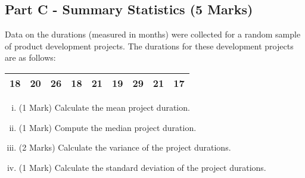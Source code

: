 \documentclass[a4paper,12pt]{article}
\begin{document}
\vspace{0.25cm}
\subsection*{Part C - Summary Statistics (5 Marks)} %
Data on the durations (measured in months) were collected for a random sample of product development projects. The durations for these development projects are as follows:

\begin{table}[ht]
	\centering
	\begin{tabular}{|rrrrrrrrr|}
		\hline
		
		18& 20& 26& 18& 21& 19& 29& 21& 17\\ 
		\hline
	\end{tabular}
\end{table}
\vspace{-0.5cm}


\begin{enumerate}[(i)]
	\item (1 Mark) Calculate the mean project duration.
	\item (1 Mark) Compute the median project duration.
	\item (2 Marks) Calculate the variance of the project durations.
	\item (1 Mark) Calculate the standard deviation of the project durations.
\end{enumerate}

%		
%		
\newpage
\end{document}
